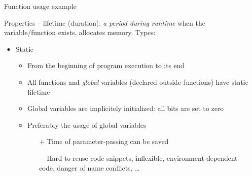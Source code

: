 \documentclass[usenames,dvipsnames,aspectratio=169]{beamer}
\begin{document}
\begin{frame}{Function usage example}
  \begin{exampleblock}{}
    \fontsize{8}{9} \selectfont
    \vspace{-.3cm}
    
    \vspace{-.3cm}
  \end{exampleblock}
\end{frame}

\begin{frame}{Properties -- lifetime}
   (duration): \emph{a period during runtime} when the variable/function exists, allocates memory.
  Types:
  \begin{itemize}
    \item Static
    \begin{itemize}
      \item From the beginning of program execution to its end
      \item All functions and \emph{global} variables (declared outside functions) have static lifetime
      \item Global variables are implicitely initialized: all bits are set to zero
      \item Preferably the usage of global variables 
      \begin{itemize}
        \item[$+$] Time of parameter-passing can be saved
        \item[$-$] Hard to reuse code snippets, inflexible, environment-dependent code, danger of name conflicts, \dots
      \end{itemize}
    \end{itemize}
  \end{itemize}
\end{frame}
\end{document}
